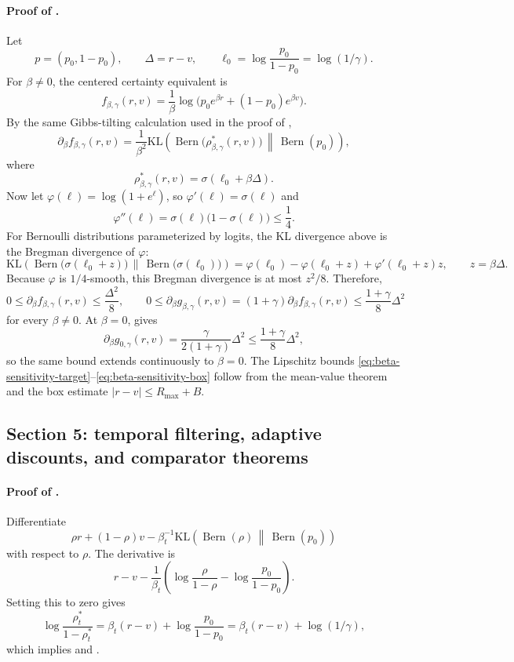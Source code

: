 \documentclass{article}
\theoremstyle{remark}
\DeclareMathOperator{\Bern}{Bern}
\newcommand{\KL}{\mathrm{KL}}
\newcommand{\pprior}{p_0}
\newcommand{\KLbin}[2]{\KL\!\left(\Bern(#1)\,\middle\|\,\Bern(#2)\right)}
\begin{document}
\paragraph{Proof of .}
Let
\[
p=(\pprior,1-\pprior),
\qquad
\Delta=r-v,
\qquad
\ell_0=\log\frac{\pprior}{1-\pprior}=\log(1/\gamma).
\]
For $\beta\neq 0$, the centered certainty equivalent is
\[
f_{\beta,\gamma}(r,v)=\frac{1}{\beta}\log\!\bigl(\pprior e^{\beta r}+(1-\pprior)e^{\beta v}\bigr).
\]
By the same Gibbs-tilting calculation used in the proof of ,
\[
\partial_\beta f_{\beta,\gamma}(r,v)
=
\frac{1}{\beta^2}
\KL\!\left(
\Bern\!\bigl(\rho^*_{\beta,\gamma}(r,v)\bigr)
\,\middle\|\,
\Bern(\pprior)
\right),
\]
where
\[
\rho^*_{\beta,\gamma}(r,v)=\sigma(\ell_0+\beta\Delta).
\]
Now let $\varphi(\ell)=\log(1+e^\ell)$, so $\varphi'(\ell)=\sigma(\ell)$ and
\[
\varphi''(\ell)=\sigma(\ell)\bigl(1-\sigma(\ell)\bigr)\le \frac14.
\]
For Bernoulli distributions parameterized by logits, the KL divergence above is the Bregman divergence of $\varphi$:
\[
\KL\!\left(
\Bern\!\bigl(\sigma(\ell_0+z)\bigr)
\,\middle\|\,
\Bern\!\bigl(\sigma(\ell_0)\bigr)
\right)
=
\varphi(\ell_0)-\varphi(\ell_0+z)+\varphi'(\ell_0+z)z,
\qquad z=\beta\Delta.
\]
Because $\varphi$ is $1/4$-smooth, this Bregman divergence is at most $z^2/8$.
Therefore,
\[
0\le \partial_\beta f_{\beta,\gamma}(r,v)\le \frac{\Delta^2}{8},
\qquad
0\le \partial_\beta g_{\beta,\gamma}(r,v)=(1+\gamma)\partial_\beta f_{\beta,\gamma}(r,v)\le \frac{1+\gamma}{8}\Delta^2
\]
for every $\beta\neq 0$.
At $\beta=0$,  gives
\[
\partial_\beta g_{0,\gamma}(r,v)=\frac{\gamma}{2(1+\gamma)}\Delta^2\le \frac{1+\gamma}{8}\Delta^2,
\]
so the same bound extends continuously to $\beta=0$.
The Lipschitz bounds \eqref{eq:beta-sensitivity-target}--\eqref{eq:beta-sensitivity-box} follow from the mean-value theorem and the box estimate $|r-v|\le R_{\max}+B$.

\subsection{Section 5: temporal filtering, adaptive discounts, and comparator theorems}
\label{app:temporal}

\paragraph{Proof of .}
Differentiate
\[
\rho r +(1-\rho)v - \beta_t^{-1}\KLbin{\rho}{\pprior}
\]
with respect to $\rho$.
The derivative is
\[
r-v-\frac{1}{\beta_t}\left(\log\frac{\rho}{1-\rho}-\log\frac{\pprior}{1-\pprior}\right).
\]
Setting this to zero gives
\[
\log\frac{\rho_t^*}{1-\rho_t^*}=\beta_t(r-v)+\log\frac{\pprior}{1-\pprior}=\beta_t(r-v)+\log(1/\gamma),
\]
which implies  and .
\end{document}
